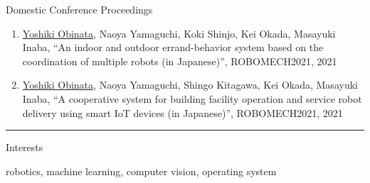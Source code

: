 \documentclass[a4paper,10pt]{article}
\newlength{\cvcolumngapwidth}
\newlength{\cvleftcolumnwidth}
\newlength{\cvrightcolumnwidth}
\newcommand{\cvsectionstyle}[1]{{\normalsize\cvsectionfont\textcolor{cvsectioncolor}{#1}}}
\newcommand{\cvheadingstyle}[1]{{\normalsize\cvheadingfont\textcolor{cvheadingcolor}{#1}}}
\newlength{\cvafteritemskipamount}
\newlength{\cvaftersectionskipamount}
\newlength{\cvbetweensectionandheadingextraskipamount}
\newlength{\cvparskip}
\newcommand{\cvsection}[1]{
    \begin{minipage}[t]{\cvleftcolumnwidth}
        \raggedleft\cvsectionstyle{#1}
    \end{minipage}%
    \hspace{\cvcolumngapwidth}%
    \begin{minipage}[t]{\cvrightcolumnwidth}
        \textcolor{cvrulecolor}{\rule{\cvrightcolumnwidth}{0.3mm}}
    \end{minipage}

    \vspace{\cvaftersectionskipamount}
}
\newcommand{\cvitem}[2]{
    \begin{minipage}[t]{\cvleftcolumnwidth}
        \raggedleft #1
    \end{minipage}%
    \hspace{\cvcolumngapwidth}%
    \begin{minipage}[t]{\cvrightcolumnwidth}
        \setlength{\parskip}{\cvparskip} #2
    \end{minipage}

    \vspace{\cvafteritemskipamount}
}
\begin{document}
\vspace{\cvbetweensectionandheadingextraskipamount}

\cvitem{
  \cvheadingstyle{Domestic Conference Proceedings}
}{
  \begin{enumerate}
  \item \underline{Yoshiki Obinata}, Naoya Yamaguchi, Koki Shinjo, Kei Okada, Masayuki Inaba, ``An indoor and outdoor errand-behavior system based on the coordination of multiple robots (in Japanese)'', ROBOMECH2021, 2021
  \item \underline{Yoshiki Obinata}, Naoya Yamaguchi, Shingo Kitagawa, Kei Okada, Masayuki Inaba, ``A cooperative system for building facility operation and service robot delivery using smart IoT devices (in Japanese)'', ROBOMECH2021, 2021


  \end{enumerate}
}



\cvsection{ADDITIONAL INFORMATION}

\vspace{\cvbetweensectionandheadingextraskipamount}


\cvitem{
    \cvheadingstyle{Interests}
}{
    robotics, machine learning, computer vision, operating system
}
\end{document}
